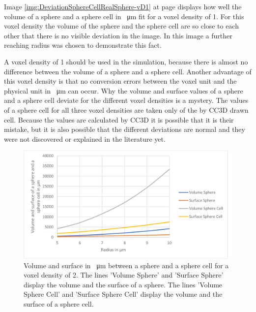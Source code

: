 Image \ref{img:DeviationSphereCellRealSphere-vD1} at page \pageref{img:DeviationSphereCellRealSphere-vD1} displays how well the volume of a sphere and a sphere cell in \SI{}{\micro\metre} fit for a voxel density of 1. For this voxel density the volume of the sphere and the sphere cell are so close to each other that there is no visible deviation in the image. In this image a further reaching radius was chosen to demonstrate this fact.

A voxel density of 1 should be used in the simulation, because there is almost no difference between the volume of a sphere and a sphere cell. Another advantage of this voxel density is that no conversion errors between the voxel unit and the physical unit in \SI{}{\micro\metre} can occur. \newline
Why the volume and surface values of a sphere and a sphere cell deviate for the different voxel densities is a mystery. The values of a sphere cell for all three voxel densities are taken only of the by \ac{CC3D} drawn cell. Because the values are calculated by \ac{CC3D} it is possible that it is their mistake, but it is also possible that the different deviations are normal and they were not discovered or explained in the literature yet.

\begin{figure}[ht]
	\center
	\includegraphics[scale=0.3]{figures/DeviationSphereToPixelSphere-vD2.png}
	\caption[Volume and surface in \SI{}{\micro\metre} between a sphere and a sphere cell for a voxel density of 2]{Volume and surface in \SI{}{\micro\metre} between a sphere and a sphere cell for a voxel density of 2. The lines 'Volume Sphere' and 'Surface Sphere' display the volume and the surface of a sphere. The lines 'Volume Sphere Cell' and 'Surface Sphere Cell' display the volume and the surface of a sphere cell.}
	\label{img:DeviationSphereCellRealSphere-vD2}
\end{figure}

